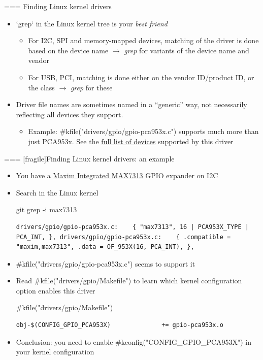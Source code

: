 === {Finding Linux kernel drivers}
  \begin{itemize}
  \item `grep` in the Linux kernel tree is your {\em best friend}
    \begin{itemize}
    \item For I2C, SPI and memory-mapped devices, matching of the
      driver is done based on the device name $\rightarrow$ {\em grep}
      for variants of the device name and vendor
    \item For USB, PCI, matching is done either on the vendor
      ID/product ID, or the class $\rightarrow$ {\em grep} for these
    \end{itemize}
  \item Driver file names are sometimes named in a ``generic'' way,
    not necessarily reflecting all devices they support.
    \begin{itemize}
    \item Example: #kfile("drivers/gpio/gpio-pca953x.c") supports much
      more than just PCA953x. See the
      \href{https://elixir.bootlin.com/linux/v5.19/source/drivers/gpio/gpio-pca953x.c\#L1221}{full
        list of devices} supported by this driver
    \end{itemize}
  \end{itemize}


=== [fragile]{Finding Linux kernel drivers: an example}
  \begin{itemize}
  \item You have a
    \href{https://www.maximintegrated.com/en/products/interface/controllers-expanders/MAX7313.html}{Maxim
      Integrated MAX7313} GPIO expander on I2C
  \item Search in the Linux kernel
    \begin{block}{git grep -i max7313}
      {\tiny
\begin{verbatim}
drivers/gpio/gpio-pca953x.c:    { "max7313", 16 | PCA953X_TYPE | PCA_INT, }, drivers/gpio/gpio-pca953x.c:    { .compatible = "maxim,max7313", .data = OF_953X(16, PCA_INT), },
\end{verbatim}
      }
    \end{block}
  \item #kfile("drivers/gpio/gpio-pca953x.c") seems to support it
  \item Read #kfile("drivers/gpio/Makefile") to learn which kernel
    configuration option enables this driver
    \begin{block}{#kfile("drivers/gpio/Makefile")}
      {\tiny
\begin{verbatim}
obj-$(CONFIG_GPIO_PCA953X)              += gpio-pca953x.o
\end{verbatim}
      }
    \end{block}
  \item Conclusion: you need to enable #kconfig("CONFIG_GPIO_PCA953X") in
    your kernel configuration
  \end{itemize}


